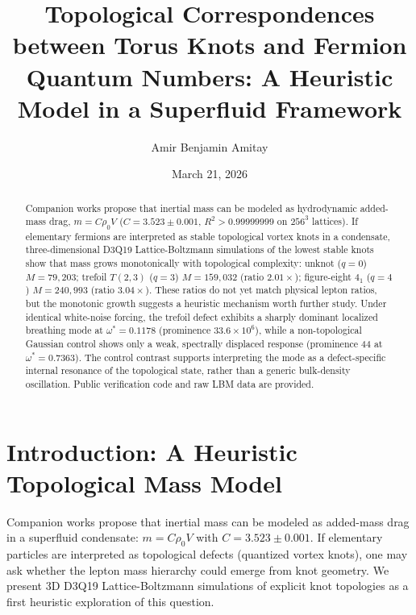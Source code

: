\documentclass[reprint,amsmath,amssymb,aps,prl,superscriptaddress]{revtex4-2}
\begin{document}
\title{Topological Correspondences between Torus Knots and Fermion Quantum Numbers: A Heuristic Model in a Superfluid Framework}

\author{Amir Benjamin Amitay}

\date{March 21, 2026}

\begin{abstract}
Companion works propose that inertial mass can be modeled as hydrodynamic added-mass drag, $m=C\rho_0V$ ($C=3.523\pm0.001$, $R^2>0.99999999$ on $256^3$ lattices). If elementary fermions are interpreted as stable topological vortex knots in a condensate, three-dimensional D3Q19 Lattice-Boltzmann simulations of the lowest stable knots show that mass grows monotonically with topological complexity: unknot ($q=0$) $M=79{,}203$; trefoil $T(2,3)$ ($q=3$) $M=159{,}032$ (ratio $2.01\times$); figure-eight $4_1$ ($q=4$) $M=240{,}993$ (ratio $3.04\times$). These ratios do not yet match physical lepton ratios, but the monotonic growth suggests a heuristic mechanism worth further study. Under identical white-noise forcing, the trefoil defect exhibits a sharply dominant localized breathing mode at $\omega^*=0.1178$ (prominence $33.6 \times 10^6$), while a non-topological Gaussian control shows only a weak, spectrally displaced response (prominence 44 at $\omega^*=0.7363$). The control contrast supports interpreting the mode as a defect-specific internal resonance of the topological state, rather than a generic bulk-density oscillation. Public verification code and raw LBM data are provided.
\end{abstract}

\maketitle

\section{Introduction: A Heuristic Topological Mass Model}
\label{sec:intro}

Companion works propose that inertial mass can be modeled as added-mass drag in a superfluid condensate: $m=C\rho_0V$ with $C=3.523\pm0.001$. If elementary particles are interpreted as topological defects (quantized vortex knots), one may ask whether the lepton mass hierarchy could emerge from knot geometry. We present 3D D3Q19 Lattice-Boltzmann simulations of explicit knot topologies as a first heuristic exploration of this question.
\end{document}
